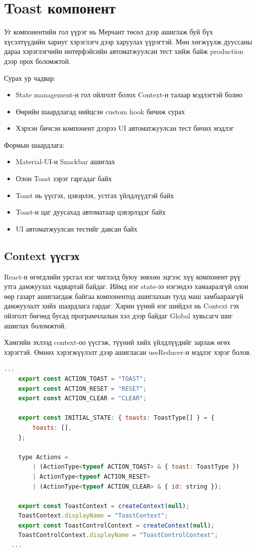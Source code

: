 \section{Toast компонент}

Уг компонентийн гол үүрэг нь Мерчант төсөл дээр ашиглаж буй бүх хүсэлтүүдийн хариуг хэрэглэгч дээр харуулах үүрэгтэй. Мөн хөгжүүлж дууссаны дараа хэрэглэгчийн интерфэйсийн автоматжуулсан тест хийж байж production дээр орох боломжтой.

Сурах ур чадвар: 
\begin{itemize}
    \item State management-н гол ойлголт болох Context-н талаар мэдлэгтэй болно
    \item Өөрийн шаардлагад нийцсэн custom hook бичиж сурах
    \item Хэрхэн бичсэн компонент дээрээ UI автоматжуулсан тест бичих мэдлэг
\end{itemize}

Формын шаардлага: 
\begin{itemize}
    \item Material-UI-н Snackbar ашиглах
    \item Олон Toast зэрэг гаргадаг байх
    \item Toast нь үүсгэх, цэвэрлэх, устгах үйлдлүүдтэй байх
    \item Toast-н цаг дуусахад автоматаар цэвэрлэдэг байх
    \item UI автоматжуулсан тестийг давсан байх
\end{itemize}

\subsection{Context үүсгэх}

React-н өгөгдлийн урсгал нэг чиглэлд буюу зөвхөн эцгээс хүү компонент рүү утга дамжуулах чадвартай байдаг. Иймд нэг state-ээ нэгэндээ хамааралгүй олон өөр газарт ашиглагдаж байгаа компонентод ашиглахын тулд маш замбаараагүй дамжуулалт хийх шаардлага гардаг. Харин үүний нэг шийдэл нь Context гэх ойлголт бөгөөд бусад програмчлалын хэл дээр байдаг Global хувьсагч шиг ашиглах боломжтой. 

Хамгийн эхлээд context-оо үүсгэж, түүний хийх үйлдлүүдийг зарлаж өгөх хэрэгтэй. Өмнөх хэрэгжүүлэлт дээр ашигласан useReducer-н мэдлэг хэрэг болов.

\begin{lstlisting}[language=Javascript, caption=Context үүсгэх, frame=single]
	...  
	export const ACTION_TOAST = "TOAST";
	export const ACTION_RESET = "RESET";
	export const ACTION_CLEAR = "CLEAR";

	export const INITIAL_STATE: { toasts: ToastType[] } = {
		toasts: [],
	};

	type Actions =
		| (ActionType<typeof ACTION_TOAST> & { toast: ToastType })
		| ActionType<typeof ACTION_RESET>
		| (ActionType<typeof ACTION_CLEAR> & { id: string });

	export const ToastContext = createContext(null);
	ToastContext.displayName = "ToastContext";
	export const ToastControlContext = createContext(null);
	ToastControlContext.displayName = "ToastControlContext";
  ...
\end{lstlisting}

